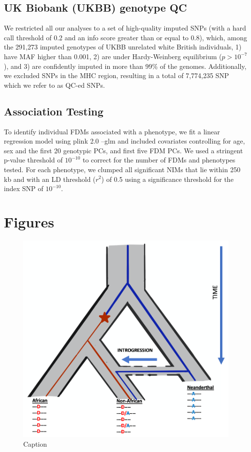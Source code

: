 \subsection{UK Biobank (UKBB) genotype QC}
We restricted all our analyses to a set of high-quality imputed SNPs (with a hard call threshold of 0.2 and an info score greater than or equal to 0.8), which, among the 291,273 imputed genotypes of UKBB unrelated white British individuals, 1) have MAF higher than 0.001, 2) are under Hardy-Weinberg equilibrium ($p > 10^{-7}$), and 3) are confidently imputed in more than 99\% of the genomes. Additionally, we excluded SNPs in the MHC region, resulting in a total of 7,774,235 SNP which we refer to as QC-ed SNPs. 
\subsection{Association Testing}
To identify individual FDMs associated with a phenotype, we fit a linear regression model using plink 2.0 --glm and included covariates controlling for age, sex and the first 20 genotypic PCs, and first five FDM PCs. We used a stringent p-value threshold of $10^{-10}$ to correct for the number of FDMs and phenotypes tested. For each phenotype, we clumped all significant NIMs that lie within 250 kb and with an LD threshold ($r^2$) of 0.5 using a significance threshold for the index SNP of $10^{-10}$.

\section{Figures}
\begin{figure}[htb]
    \centering
    \includegraphics{chapter4/figures/fig41.png}
    \caption{Caption}
    \label{fig:my_label}
\end{figure}
